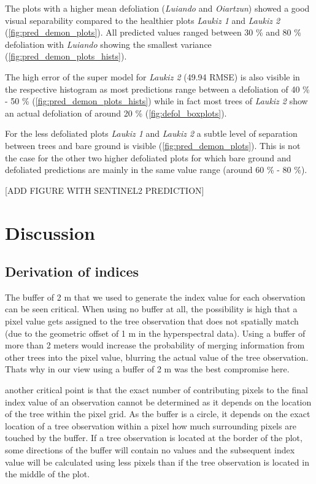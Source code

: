 \documentclass[review]{elsarticle}
\begin{document}
\noindent The plots with a higher mean defoliation (\textit{Luiando} and \textit{Oiartzun}) showed a good visual separability compared to the healthier plots \textit{Laukiz 1} and \textit{Laukiz 2} (\autoref{fig:pred_demon_plots}).
All predicted values ranged between 30 \% and 80 \% defoliation with \textit{Luiando} showing the smallest variance (\autoref{fig:pred_demon_plots_hists}).

The high error of the super model for \textit{Laukiz 2} (49.94 RMSE) is also visible in the respective histogram as most predictions range between a defoliation of 40 \% - 50 \% (\autoref{fig:pred_demon_plots_hists}) while in fact most trees of \textit{Laukiz 2} show an actual defoliation of around 20 \% (\autoref{fig:defol_boxplots}).

For the less defoliated plots \textit{Laukiz 1} and \textit{Laukiz 2} a subtle level of separation between trees and bare ground is visible (\autoref{fig:pred_demon_plots}).
This is not the case for the other two higher defoliated plots for which bare ground and defoliated predictions are mainly in the same value range (around 60 \% - 80 \%).

	[ADD FIGURE WITH SENTINEL2 PREDICTION]

\section{Discussion}

\subsection{Derivation of indices}

\noindent The buffer of 2 m that we used to generate the index value for each observation can be seen critical.
When using no buffer at all, the possibility is high that a pixel value gets assigned to the tree observation that does not spatially match (due to the geometric offset of 1 m in the hyperspectral data).
Using a buffer of more than 2 meters would increase the probability of merging information from other trees into the pixel value, blurring the actual value of the tree observation.
Thats why in our view using a buffer of 2 m was the best compromise here.

another critical point is that the exact number of contributing pixels to the final index value of an observation cannot be determined as it depends on the location of the tree within the pixel grid.
As the buffer is a circle, it depends on the exact location of a tree observation within a pixel how much surrounding pixels are touched by the buffer.
If a tree observation is located at the border of the plot, some directions of the buffer will contain no values and the subsequent index value will be calculated using less pixels than if the tree observation is located in the middle of the plot.
\end{document}
